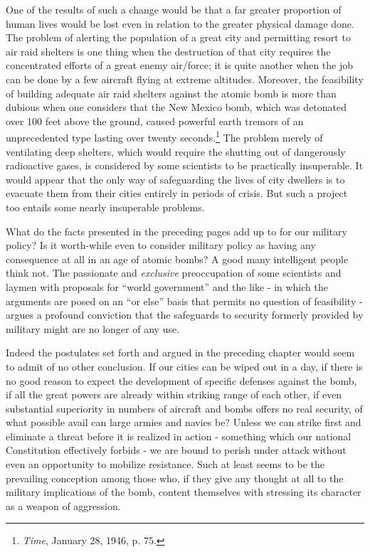 One of the results of such a change would be that a far greater proportion of human lives would be lost even in relation to the greater physical damage done. The problem of alerting the population of a great city and permitting resort to air raid shelters is one thing when the destruction of that city requires the concentrated efforts of a great enemy air/force; it is quite another when the job can be done by a few aircraft flying at extreme altitudes. Moreover, the feasibility of building adequate air raid shelters against the atomic bomb is more than dubious when one considers that the New Mexico bomb, which was detonated over 100 feet above the ground, caused powerful earth tremors of an unprecedented type lasting over twenty seconds.\footnote{\textit{Time}, January 28, 1946, p. 75.} The problem merely of ventilating deep shelters, which would require the shutting out of dangerously radioactive gases, is considered by some scientists to be practically insuperable. It would appear that the only way of safeguarding the lives of city dwellers is to evacuate them from their cities entirely in periods of crisis. But such a project too entails some nearly insuperable problems.

What do the facts presented in the preceding pages add up to for our military policy? Is it worth-while even to consider military policy as having any consequence at all in an age of atomic bombs? A good many intelligent people think not. The passionate and \emph{exclusive} preoccupation of some scientists and laymen with proposals for ``world government'' and the like - in which the arguments are posed on an ``or else'' basis that permits no question of feasibility - argues a profound conviction that the safeguards to security formerly provided by military might are no longer of any use.

Indeed the postulates set forth and argued in the preceding chapter would seem to admit of no other conclusion. If our cities can be wiped out in a day, if there is no good reason to expect the development of specific defenses against the bomb, if all the great powers are already within striking range of each other, if even substantial superiority in numbers of aircraft and bombs offers no real security, of what possible avail can large armies and navies be? Unless we can strike first and eliminate a threat before it is realized in action - something which our national Constitution effectively forbids - we are bound to perish under attack without even an opportunity to mobilize resistance. Such at least seems to be the prevailing conception among those who, if they give any thought at all to the military implications of the bomb, content themselves with stressing its character as a weapon of aggression.

